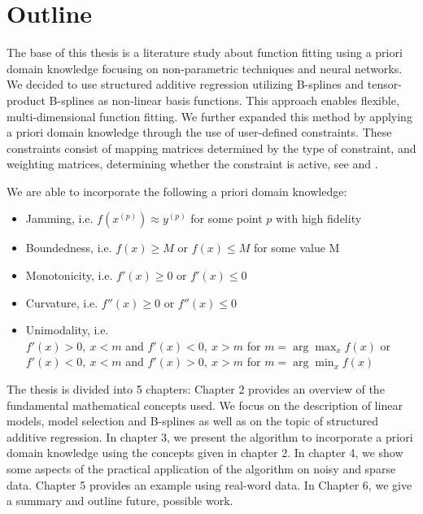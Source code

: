 \section{Outline}

The base of this thesis is a literature study about function fitting using a priori domain knowledge focusing on non-parametric techniques and neural networks. We decided to use structured additive regression \cite{fahrmeir2007regression} utilizing B-splines and tensor-product B-splines as non-linear basis functions. This approach enables flexible, multi-dimensional function fitting. We further expanded this method by applying a priori domain knowledge through the use of user-defined constraints. These constraints consist of mapping matrices determined by the type of constraint, and weighting matrices, determining whether the constraint is active, see \cite{hofner2011monotonicity} and \cite{bollaerts2006simple}.

We are able to incorporate the following a priori domain knowledge: 

\begin{itemize} \label{list:possible-constraints}
	\item Jamming, i.e. $f(x^{(p)}) \approx y^{(p)}$ for some point $p$ with high fidelity
	\item Boundedness, i.e. $f(x) \ge M$ or $f(x) \le M$ for some value M
	\item Monotonicity, i.e. $f'(x) \ge 0$ or $f'(x) \le 0$
	\item Curvature, i.e. $f''(x) \ge 0$ or $f''(x) \le 0$
	\item Unimodality, i.e. \\ $f'(x) > 0, \ x < m$ and $f'(x) < 0, \ x > m$ for $m = \arg \max_{x} f(x)$ or \\ $f'(x) < 0, \ x < m$ and $f'(x) > 0, \ x > m$ for $m = \arg \min_{x} f(x)$

\end{itemize}

The thesis is divided into 5 chapters: Chapter 2 provides an overview of the fundamental mathematical concepts used. We focus on the description of linear models, model selection and B-splines as well as on the topic of structured additive regression. In chapter 3, we present the algorithm to incorporate a priori domain knowledge using the concepts given in chapter 2. In chapter 4, we show some aspects of the practical application of the algorithm on noisy and sparse data. Chapter 5 provides an example using real-word data. In Chapter 6, we give a summary and outline future, possible work. 
